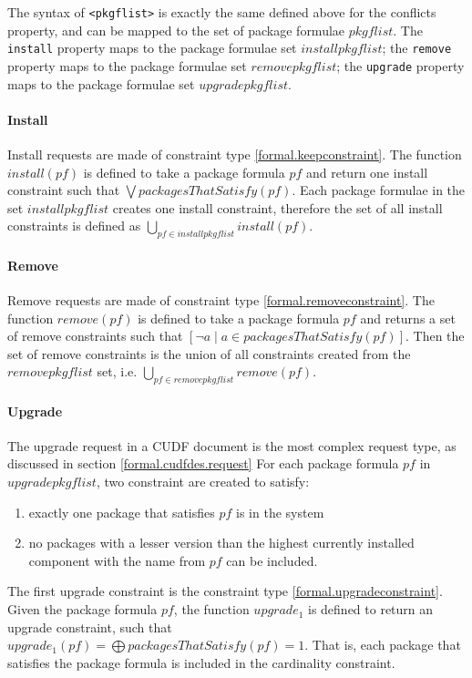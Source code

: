 The syntax of \verb+<pkgflist>+ is exactly the same defined above for the conflicts property, and can be mapped to the set of package formulae $pkgflist$.
The \verb+install+ property maps to the package formulae set $installpkgflist$; the \verb+remove+ property maps to the package formulae set $removepkgflist$;
the \verb+upgrade+ property maps to the package formulae set  $upgradepkgflist$.

\paragraph{Install}
Install requests are made of constraint type \ref{formal.keepconstraint}.
The function  $install(pf)$ is defined to take a package formula $pf$ and return one install constraint such that $\bigvee packagesThatSatisfy(pf)$.
Each package formulae in the set $installpkgflist$ creates one install constraint,
therefore the set of all install constraints is defined as $\bigcup \limits_{pf \in installpkgflist} install(pf)$.

\paragraph{Remove}
Remove requests are made of constraint type \ref{formal.removeconstraint}.
The function $remove(pf)$ is defined to take a package formula $pf$ and returns a set of remove constraints such that $[\neg a \mid  a \in packagesThatSatisfy(pf)]$.
Then the set of remove constraints is the union of all constraints created from the $removepkgflist$ set, i.e. $\bigcup \limits_{pf \in removepkgflist} remove(pf)$.

\paragraph{Upgrade}
The upgrade request in a CUDF document is the most complex request type, as discussed in section \ref{formal.cudfdes.request}
For each package formula $pf$ in $upgradepkgflist$, two constraint are created to satisfy:
\begin{enumerate}
  \item exactly one package that satisfies $pf$ is in the system
  \item no packages with a lesser version than the highest currently installed component with the name from $pf$ can be included.
\end{enumerate} 

The first upgrade constraint is the constraint type \ref{formal.upgradeconstraint}.
Given the package formula $pf$, the function $upgrade_1$ is defined to return an upgrade constraint,
such that $upgrade_1(pf) = \bigoplus packagesThatSatisfy(pf) = 1$.
That is, each package that satisfies the package formula is included in the cardinality constraint.

